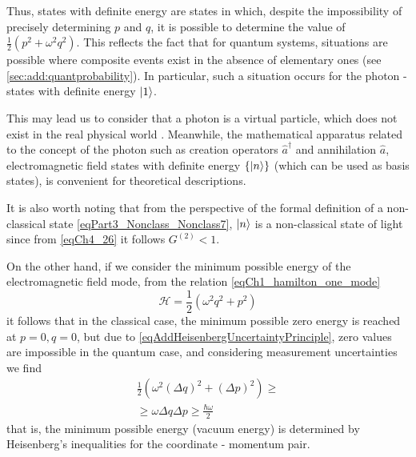 \begin{remark}
  Thus, states with definite energy are states
  in which, despite the impossibility of precisely determining $p$
  and $q$, it is possible to determine the value of 
  \(
  \frac{1}{2} \left(p^2 +
  \omega^2q^2\right)
  \). This reflects the fact that for quantum systems, situations are possible
  where composite events exist in the absence
  of elementary ones (see \autoref{sec:add:quantprobability}). 
  In particular, such a situation occurs for the photon
  - states with definite energy $\ket{1}$.

  This may lead us to consider that a photon is
  a virtual particle, which does not exist in the real physical world
  \cite{Lamb1995}. Meanwhile, the mathematical apparatus related to
  the concept of the photon such as creation operators $\hat{a}^\dag$ and
  annihilation $\hat{a}$, electromagnetic field states with
  definite energy $\{\ket{n}\}$ (which can be
  used as basis states), is convenient for theoretical descriptions.

  It is also worth noting that from the perspective of the formal definition of
  a non-classical state \eqref{eqPart3_Nonclass_Nonclass7},
  $\ket{n}$ is a non-classical 
  state of light since from \eqref{eqCh4_26} it follows $G^{(2)} <
  1$.

  On the other hand, if we consider the minimum possible energy
  of the electromagnetic field mode, from the relation
  \eqref{eqCh1_hamilton_one_mode} 
  \[
  \mathcal{H} = \frac{1}{2}\left(\omega^2 q^2 + p^2\right)
  \]
  it follows that in the classical case, the minimum possible zero
  energy is reached at $p = 0, q=0$, but due to
  \eqref{eqAddHeisenbergUncertaintyPrinciple}, zero values
  are impossible in the quantum case, and considering measurement uncertainties
  we find
  \begin{eqnarray}
    \frac{1}{2}\left(\omega^2 (\Delta q)^2 + (\Delta p)^2\right) \ge
    \nonumber \\
    \ge \omega \Delta q \Delta p \ge \frac{\hbar \omega}{2}
    \nonumber
  \end{eqnarray}
  that is, the minimum possible energy (vacuum energy) is determined
  by Heisenberg's inequalities for the coordinate - momentum pair.  
  \label{rem:antiphoton}
\end{remark}